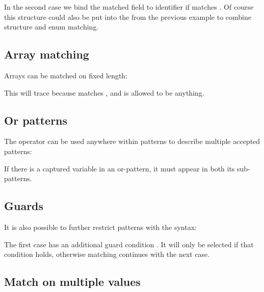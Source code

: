 
In the second case we bind the matched  field to identifier  if  matches . Of course this structure could also be put into the  from the previous example to combine structure and enum matching.

\subsection{Array matching}
\label{lf-pattern-matching-array}

Arrays can be matched on fixed length:


This will trace  because  matches , and  is allowed to be anything.

\subsection{Or patterns}
\label{lf-pattern-matching-or}

The \expr{|} operator can be used anywhere within patterns to describe multiple accepted patterns:


If there is a captured variable in an or-pattern, it must appear in both its sub-patterns.

\subsection{Guards}
\label{lf-pattern-matching-guards}

It is also possible to further restrict patterns with the  syntax:


The first case has an additional guard condition . It will only be selected if that condition holds, otherwise matching continues with the next case.

\subsection{Match on multiple values}
\label{lf-pattern-matching-tuples}


